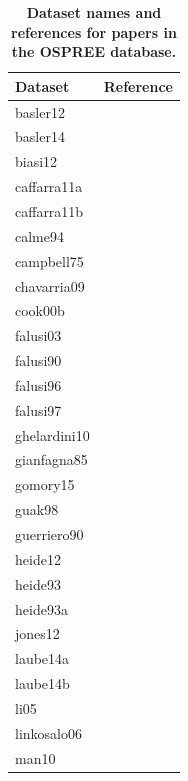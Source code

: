 \documentclass{article}
\begin{document}
\begin{footnotesize} 

\begingroup\footnotesize
\begin{longtable}{p{}p{}}
\caption{\textbf{Dataset names and references for papers in the OSPREE database.}} \\ 
  \hline
Dataset & Reference \\ 
  \hline \endhead  \hline
basler12 & \citep{Basler:2012} \\ 
  basler14 & \citep{Basler:2014aa} \\ 
  biasi12 & \citep{Biasi:2012} \\ 
  caffarra11a & \citep{Caffarra:2011a} \\ 
  caffarra11b & \citep{Caffarra:2011b} \\ 
  calme94 & \citep{Calme:1994aa} \\ 
  campbell75 & \citep{Campbell:1975aa} \\ 
  chavarria09 & \citep{Chavarria:2009aa} \\ 
  cook00b & \citep{Cook:2000aa} \\ 
  falusi03 & \citep{Falusi:2003aa} \\ 
  falusi90 & \citep{Falusi:1990aa} \\ 
  falusi96 & \citep{Falusi:1996aa} \\ 
  falusi97 & \citep{Falusi:1997aa} \\ 
  ghelardini10 & \citep{Ghelardini:2010aa} \\ 
  gianfagna85 & \citep{Gianfagna:1985aa} \\ 
  gomory15 & \citep{Gomory:2015aa} \\ 
  guak98 & \citep{Guak:1998aa} \\ 
  guerriero90 & \citep{guerriero:1990} \\ 
  heide12 & \citep{Heide:2012aa} \\ 
  heide93 & \citep{Heide:1993} \\ 
  heide93a & \citep{Heide:1993a} \\ 
  jones12 & \citep{Jones:2012} \\ 
  laube14a & \citep{Laube:2014a} \\ 
  laube14b & \citep{Laube:2014b} \\ 
  li05 & \citep{Li:2005aa} \\ 
  linkosalo06 & \citep{Linkosalo:2006aa} \\ 
  man10 & \citep{Man:2010aa} \\ 

\end{longtable}
\end{footnotesize}
\end{document}
